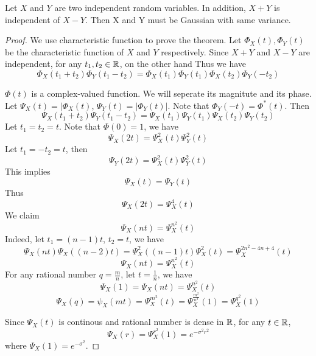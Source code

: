 \begin{theorem}
	Let $X$ and $Y$ are two independent random variables. In addition, $X+Y$ is independent of $X-Y$. Then X and Y must be Gaussian with same variance.
\end{theorem}
\begin{proof}
	We use characteristic function to prove the theorem. Let $\Phi_X(t), \Phi_Y(t)$ be the characteristic function of $X$ and $Y$ respectively. Since $X+Y$ and $X-Y$ are independent, for any $t_1, t_2 \in \mathbb{R}$,
	on the other hand
	Thus we have
	\begin{equation}
		\Phi_X(t_1+t_2)\Phi_Y(t_1-t_2) =\Phi_X(t_1)\Phi_Y(t_1)\Phi_X(t_2)\Phi_Y(-t_2) \label{eq:rotation_gaussian}
	\end{equation}
	
	$\Phi(t)$ is a complex-valued function. We will seperate its magnitute and its phase. Let $\Psi_X (t) = |\Phi_X(t)$, $\Psi_Y (t) = |\Phi_Y(t)|$. Note that $\Phi_Y (-t) = \Phi^*(t)$. Then
	$$\Psi_X(t_1+t_2)\Psi_Y(t_1-t_2) =\Psi_X(t_1)\Psi_Y(t_1)\Psi_X(t_2)\Psi_Y(t_2)$$
	Let $t_1 = t_2 = t$. Note that $\Phi(0)=1$, we have
	$$\Psi_X(2t) =\Psi_X^2(t)\Psi^2_Y(t)$$
	Let $t_1= -t_2 = t$, then
	$$\Psi_Y(2t) =\Psi_X^2(t)\Psi^2_Y(t)$$
	This implies
	$$\Psi_X(t) =\Psi_Y(t)$$
	Thus
	$$\Psi_X(2t) =\Psi_X^4(t)$$
	We claim 
	$$\Psi_X(nt) =\Psi_X^{n^2}(t)$$
	Indeed, let $t_1=(n-1)t$, $t_2=t$, we have
	$$\Psi_X(nt)\Psi_X((n-2)t) =\Psi_X^2((n-1)t)\Psi_X^2(t) = \Psi_X^{2n^2-4n+4}(t) $$
	$$\Psi_X(nt) = \Psi_X^{n^2}(t)$$
	For any rational number $q = \frac{m}{n}$, let $t=\frac{1}{n}$, we have
	$$\Psi_X(1) = \Psi_X(nt) = \Psi_X^{n^2}(t)$$
	$$\Psi_X(q) = \psi_X(mt) = \Psi_X^{m^2}(t) = \Psi_X^\frac{m^2}{n^2}(1)=\Psi_X^{q^2}(1)$$
	
	Since $\Psi_X(t)$ is continous and rational number is dense in $\mathbb{R}$, for any $t\in \mathbb{R}$,
		$$\Psi_X(r) =\Psi_X^{r^2}(1)=e^{-\sigma^2 r^2}$$
	where $\Psi_X(1) = e^{-\sigma^2}$.
	

\end{proof}
